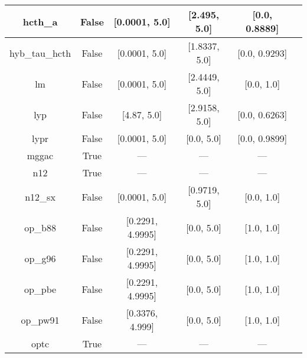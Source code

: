 \begin{tabular}{|c|c|c|c|c|l|}
       hcth\_a &                 False &    [0.0001, 5.0] &     [2.495, 5.0] &  [0.0, 0.8889] &                                      \cite{Hamprecht1998_6264} \\ \hline
hyb\_tau\_hcth &                 False &    [0.0001, 5.0] &    [1.8337, 5.0] &  [0.0, 0.9293] &                                          \cite{Boese2002_9559} \\ \hline
            lm &                 False &    [0.0001, 5.0] &    [2.4449, 5.0] &     [0.0, 1.0] &                             \cite{Langreth1981_446,Hu1985_391} \\ \hline
           lyp &                 False &      [4.87, 5.0] &    [2.9158, 5.0] &  [0.0, 0.6263] &                            \cite{Lee1988_785,Miehlich1989_200} \\ \hline
          lypr &                 False &    [0.0001, 5.0] &       [0.0, 5.0] &  [0.0, 0.9899] &                                             \cite{Ai2021_1207} \\ \hline
         mggac &                  True &              --- &              --- &            --- &                                        \cite{Patra2019_155140} \\ \hline
           n12 &                  True &              --- &              --- &            --- &                                       \cite{Peverati2012_2310} \\ \hline
       n12\_sx &                 False &    [0.0001, 5.0] &    [0.9719, 5.0] &     [0.0, 1.0] &                                      \cite{Peverati2012_16187} \\ \hline
       op\_b88 &                 False & [0.2291, 4.9995] &       [0.0, 5.0] &     [1.0, 1.0] &                                       \cite{Tsuneda1999_10664} \\ \hline
       op\_g96 &                 False & [0.2291, 4.9995] &       [0.0, 5.0] &     [1.0, 1.0] &                      \cite{Tsuneda1999_10664,Tsuneda1999_5656} \\ \hline
       op\_pbe &                 False & [0.2291, 4.9995] &       [0.0, 5.0] &     [1.0, 1.0] &                      \cite{Tsuneda1999_10664,Tsuneda1999_5656} \\ \hline
      op\_pw91 &                 False &  [0.3376, 4.999] &       [0.0, 5.0] &     [1.0, 1.0] &                      \cite{Tsuneda1999_10664,Tsuneda1999_5656} \\ \hline
          optc &                  True &              --- &              --- &            --- &                                           \cite{Cohen2001_607} \\ \hline

\end{tabular}
